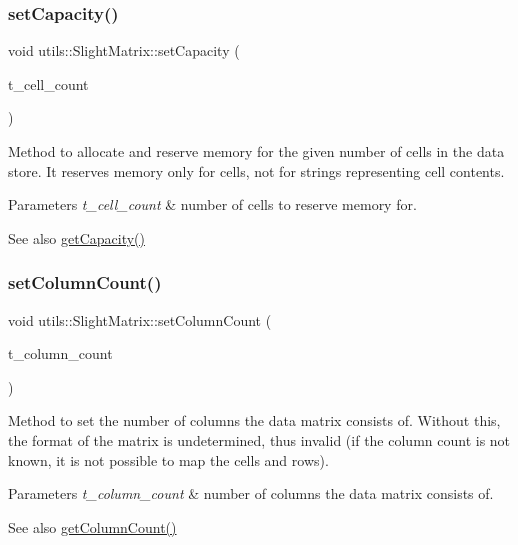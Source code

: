 \subsubsection{\texorpdfstring{set\+Capacity()}{setCapacity()}}
{\footnotesize\ttfamily void utils\+::\+Slight\+Matrix\+::set\+Capacity (\begin{DoxyParamCaption}\item[{size\+\_\+t}]{t\+\_\+cell\+\_\+count }\end{DoxyParamCaption})}

Method to allocate and reserve memory for the given number of cells in the data store. It reserves memory only for cells, not for strings representing cell contents. 
\begin{DoxyParams}{Parameters}
{\em t\+\_\+cell\+\_\+count} & number of cells to reserve memory for. \\
\hline
\end{DoxyParams}
\begin{DoxySeeAlso}{See also}
\hyperlink{classutils_1_1SlightMatrix_addbfd1ec641100a7cda0b4f6e39ae676}{get\+Capacity()} 
\end{DoxySeeAlso}
\mbox{\label{classutils_1_1SlightMatrix_a0106a8dc432d51ac9248ba7920f8913a}} 
\subsubsection{\texorpdfstring{set\+Column\+Count()}{setColumnCount()}}
{\footnotesize\ttfamily void utils\+::\+Slight\+Matrix\+::set\+Column\+Count (\begin{DoxyParamCaption}\item[{size\+\_\+t}]{t\+\_\+column\+\_\+count }\end{DoxyParamCaption})}

Method to set the number of columns the data matrix consists of. Without this, the format of the matrix is undetermined, thus invalid (if the column count is not known, it is not possible to map the cells and rows). 
\begin{DoxyParams}{Parameters}
{\em t\+\_\+column\+\_\+count} & number of columns the data matrix consists of. \\
\hline
\end{DoxyParams}
\begin{DoxySeeAlso}{See also}
\hyperlink{classutils_1_1SlightMatrix_aa08a3c2d096ac82b1688b1edc5bb71fd}{get\+Column\+Count()} 
\end{DoxySeeAlso}
\mbox{\label{classutils_1_1SlightMatrix_a666f126473f47493d127d32133f77894}} 
